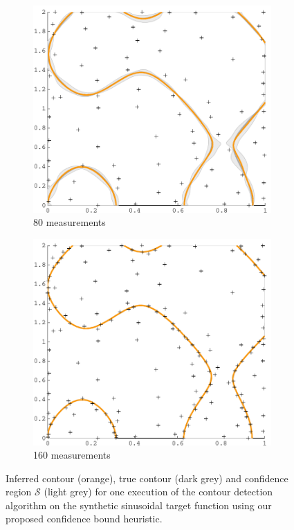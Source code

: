 \documentclass[11pt]{article} %
\begin{document}
\begin{figure}[tb]
\begin{subfigure}[b]{0.5\textwidth}
  \end{subfigure}
  \begin{subfigure}[b]{0.5\textwidth}
    \centering
    \includegraphics[width=\textwidth]{figures/sin2d_80}
    \caption{80 measurements}
  \end{subfigure}
  \hfill
  \begin{subfigure}[b]{0.5\textwidth}
    \centering
    \includegraphics[width=\textwidth]{figures/sin2d_160}
    \caption{160 measurements}
  \end{subfigure}
  \caption{Inferred contour (orange), true contour (dark grey) and confidence
           region $\mathcal{S}$ (light grey) for one execution of the
           contour detection algorithm on the synthetic sinusoidal target
           function using our proposed confidence bound heuristic.}
  \label{fig:sin2d_steps}
\end{figure}
\end{document}
